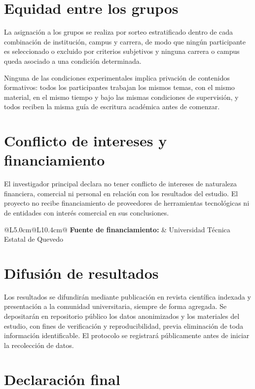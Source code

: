 \documentclass[11pt,a4paper]{article}
\begin{document}
\section{Equidad entre los grupos}

La asignaci\'on a los grupos se realiza por sorteo estratificado dentro de cada combinaci\'on de instituci\'on, campus y carrera, de modo que ning\'un participante es seleccionado o excluido por criterios subjetivos y ninguna carrera o campus queda asociado a una condici\'on determinada.

Ninguna de las condiciones experimentales implica privaci\'on de contenidos formativos: todos los participantes trabajan los mismos temas, con el mismo material, en el mismo tiempo y bajo las mismas condiciones de supervisi\'on, y todos reciben la misma gu\'ia de escritura acad\'emica antes de comenzar.

\section{Conflicto de intereses y financiamiento}

El investigador principal declara no tener conflicto de intereses de naturaleza financiera, comercial ni personal en relaci\'on con los resultados del estudio. El proyecto no recibe financiamiento de proveedores de herramientas tecnol\'ogicas ni de entidades con inter\'es comercial en sus conclusiones.

\vspace{2pt}
\begin{tabular}{@{}L{5.0cm}@{}L{10.4cm}@{}}
	\textbf{\small Fuente de financiamiento:} & Universidad Técnica Estatal de Quevedo \\
\end{tabular}

\section{Difusi\'on de resultados}

Los resultados se difundir\'an mediante publicaci\'on en revista cient\'ifica indexada y presentaci\'on a la comunidad universitaria, siempre de forma agregada. Se depositar\'an en repositorio p\'ublico los datos anonimizados y los materiales del estudio, con fines de verificaci\'on y reproducibilidad, previa eliminaci\'on de toda informaci\'on identificable. El protocolo se registrar\'a p\'ublicamente antes de iniciar la recolecci\'on de datos.

\section{Declaraci\'on final}
\end{document}
